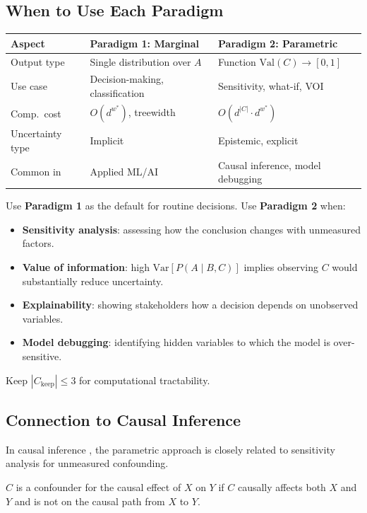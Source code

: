 \subsection{When to Use Each Paradigm}

\begin{center}
\small
\begin{tabular}{p{2.5cm}p{5cm}p{5cm}}
\hline
\textbf{Aspect} & \textbf{Paradigm 1: Marginal} & \textbf{Paradigm 2: Parametric}\\\hline
Output type & Single distribution over $A$ & Function $\mathrm{Val}(C)\to[0,1]$\\
Use case & Decision-making, classification & Sensitivity, what-if, VOI\\
Comp.\ cost & $O(d^{w^*})$, treewidth & $O(d^{|C|}{\cdot}d^{w^*})$\\
Uncertainty type & Implicit & Epistemic, explicit\\
Common in & Applied ML/AI & Causal inference, model debugging\\\hline
\end{tabular}
\end{center}

Use \textbf{Paradigm 1} as the default for routine decisions. Use
\textbf{Paradigm 2} when:
\begin{itemize}
    \item \textbf{Sensitivity analysis}: assessing how the conclusion changes
          with unmeasured factors.
    \item \textbf{Value of information}: high $\mathrm{Var}[P(A\mid B,C)]$
          implies observing $C$ would substantially reduce uncertainty.
    \item \textbf{Explainability}: showing stakeholders how a decision depends
          on unobserved variables.
    \item \textbf{Model debugging}: identifying hidden variables to which
          the model is over-sensitive.
\end{itemize}
Keep $|C_{\mathrm{keep}}|\leq3$ for computational tractability.

\subsection{Connection to Causal Inference}

In causal inference \cite{pearl2009}, the parametric approach is closely
related to sensitivity analysis for unmeasured confounding.

\begin{definition}[Confounding]
$C$ is a confounder for the causal effect of $X$ on $Y$ if $C$ causally
affects both $X$ and $Y$ and is not on the causal path from $X$ to $Y$.
\end{definition}

